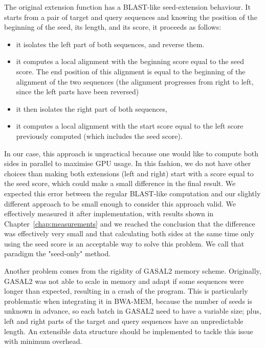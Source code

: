 The original extension function has a BLAST-like seed-extension behaviour. It starts from a pair of target and query sequences and knowing the position of the beginning of the seed, its length, and its score, it proceeds as follows:
\begin{itemize}
	\item it isolates the left part of both sequences, and reverse them.
	\item it computes a local alignment with the beginning score equal to the seed score. The end position of this alignment is equal to the beginning of the alignment of the two sequences (the alignment progresses from right to left, since the left parts have been reversed)
	\item it then isolates the right part of both sequences,
	\item it computes a local alignment with the start score equal to the left score previously computed (which includes the seed score).
\end{itemize}

In our case, this approach is unpractical because one would like to compute both sides in parallel to maximise GPU usage. In this fashion, we do not have other choices than making both extensions (left and right) start with a score equal to the seed score, which could make a small difference in the final result. We expected this error between the regular BLAST-like computation and our slightly different approach to be small enough to consider this approach valid. We effectively measured it after implementation, with results shown in Chapter~\ref{chap:measurements} and we reached the conclusion that the difference was effectively very small and that calculating both sides at the same time only using the seed score is an acceptable way to solve this problem. We call that paradigm the "seed-only" method.

Another problem comes from the rigidity of GASAL2 memory scheme. Originally, GASAL2 was not able to scale in memory and adapt if some sequences were longer than expected, resulting in a crash of the program. This is particularly problematic when integrating it in BWA-MEM, because the number of seeds is unknown in advance, so each batch in GASAL2 need to have a variable size; plus, left and right parts of the target and query sequences have an unpredictable length. An extensible data structure should be implemented to tackle this issue with minimum overhead.



